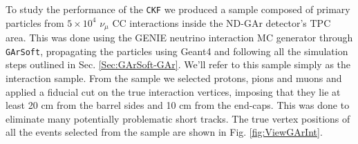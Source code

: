 To study the performance of the \texttt{CKF} we produced a sample composed of primary particles from $5\times10^4$  $\nu_\mu$ CC interactions inside the ND-GAr detector's TPC area. This was done using the GENIE neutrino interaction MC generator through \texttt{GArSoft}, propagating the particles using Geant4 and following all the simulation steps outlined in Sec. \ref{Sec:GArSoft-GAr}. We'll refer to this sample simply as the interaction sample. From the sample we selected protons, pions and muons and applied a fiducial cut on the true interaction vertices, imposing that they lie at least 20 cm from the barrel sides and 10 cm from the end-caps. This was done to eliminate many potentially problematic short tracks. The true vertex positions of all the events selected from the sample are shown in Fig. \ref{fig:ViewGArInt}.


